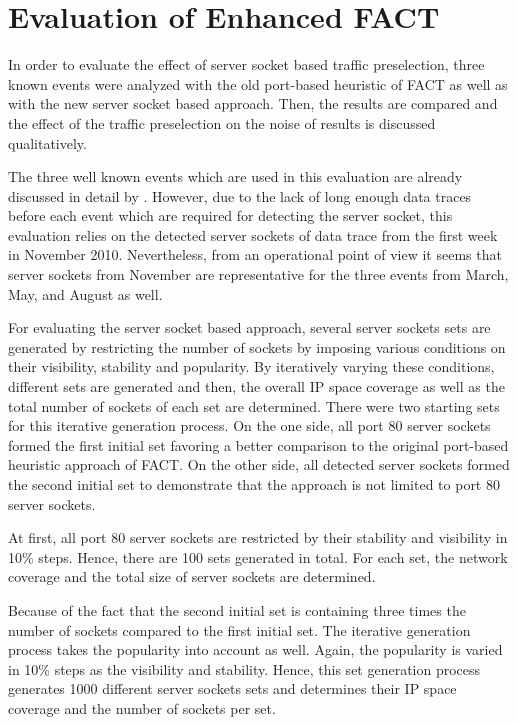 \section{Evaluation of Enhanced FACT\label{section:enhanced_FACT_eval}} 
In order to evaluate the effect of \gls{server socket} based traffic preselection, three known events were analyzed with the old port-based heuristic of \gls{FACT} as well as with the new \gls{server socket} based approach. 
Then, the results are compared and the effect of the traffic preselection on the noise of results is discussed qualitatively.

The three well known events which are used in this evaluation are already discussed in detail by \citet{SchatzmannPAM2011}. 
However, due to the lack of long enough data traces before each event which are required for detecting the \gls{server socket}, this evaluation relies on the detected \glspl{server socket} of data trace from the first week in November 2010. 
Nevertheless, from an operational point of view it seems that \glspl{server socket} from November are representative for the three events from March, May, and August as well.

For evaluating the \gls{server socket} based approach, several \glspl{server socket} sets are generated by restricting the number of sockets by imposing various conditions on their visibility, stability and popularity. 
By iteratively varying these conditions, different sets are generated and then, the overall IP space coverage as well as the total number of sockets of each set are determined. 
There were two starting sets for this iterative generation process. 
On the one side, all port 80 \glspl{server socket} formed the first initial set favoring a better comparison to the original port-based heuristic approach of FACT. 
On the other side, all detected \glspl{server socket} formed the second initial set to demonstrate that the approach is not limited to port 80 \glspl{server socket}. 

At first, all port 80 \glspl{server socket} are restricted by their stability and visibility in 10\% steps. Hence, there are 100 sets generated in total. 
For each set, the network coverage and the total size of \glspl{server socket} are determined. 

Because of the fact that the second initial set is containing three times the number of sockets compared to the first initial set.
The iterative generation process takes the popularity into account as well.
Again, the popularity is varied in 10\% steps as the visibility and stability. 
Hence, this set generation process generates 1000 different \glspl{server socket} sets and determines their IP space coverage and the number of sockets per set.

